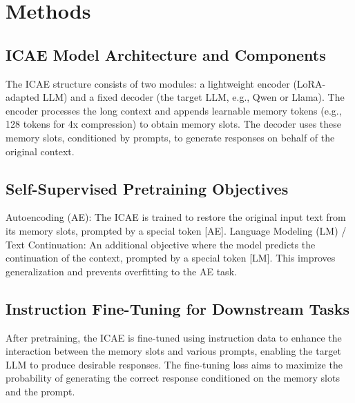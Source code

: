 \chapter{Methods}


\section{ICAE Model Architecture and Components}

The ICAE \cite{ge_-context_2024} structure consists of two modules: a lightweight encoder (LoRA-adapted LLM) and a fixed decoder (the target LLM, e.g., Qwen or Llama).
The encoder processes the long context and appends learnable memory tokens (e.g., 128 tokens for 4x compression) to obtain memory slots.
The decoder uses these memory slots, conditioned by prompts, to generate responses on behalf of the original context.


\section{Self-Supervised Pretraining Objectives}

Autoencoding (AE): The ICAE \cite{ge_-context_2024} is trained to restore the original input text from its memory slots, prompted by a special token [AE].
Language Modeling (LM) / Text Continuation: An additional objective where the model predicts the continuation of the context, prompted by a special token [LM].
This improves generalization and prevents overfitting to the AE task.


\section{Instruction Fine-Tuning for Downstream Tasks}

After pretraining, the ICAE \cite{ge_-context_2024} is fine-tuned using instruction data to enhance the interaction between the memory slots and various prompts, enabling the target LLM to produce desirable responses.
The fine-tuning loss aims to maximize the probability of generating the correct response conditioned on the memory slots and the prompt.


